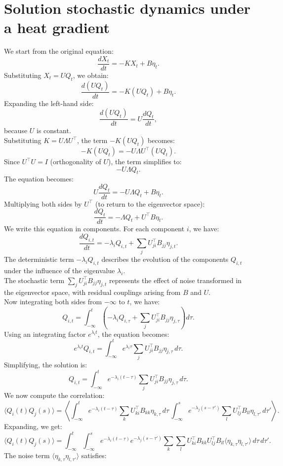 \documentclass[English, Lau, oneside]{sapthesis}
\begin{document}
\section{Solution stochastic dynamics under a heat gradient}
We start from the original equation:
\[
\frac{dX_t}{dt} = -K X_t + B \eta_t.
\]
Substituting \(X_t = U Q_t\), we obtain:
\[
\frac{d(U Q_t)}{dt} = -K (U Q_t) + B \eta_t.
\]
Expanding the left-hand side:
\[
\frac{d(U Q_t)}{dt} = U \frac{dQ_t}{dt},
\]
because \(U\) is constant.\\
Substituting \(K = U \Lambda U^\top\), the term \(-K(U Q_t)\) becomes:
\[
-K(U Q_t) = -U \Lambda U^\top (U Q_t).
\]
Since \(U^\top U = I\) (orthogonality of \(U\)), the term simplifies to:
\[
- U \Lambda Q_t.
\]
The equation becomes:
\[
U \frac{dQ_t}{dt} = -U \Lambda Q_t + B \eta_t.
\]
Multiplying both sides by \(U^\top\) (to return to the eigenvector space):
\[
\frac{dQ_t}{dt} = -\Lambda Q_t + U^\top B \eta_t.
\]
We write this equation in components. For each component \(i\), we have:
\[
\frac{dQ_{i,t}}{dt} = -\lambda_i Q_{i,t} + \sum_j U_{ji}^\top B_{jj} \eta_{j,t}.
\]
The deterministic term \(-\lambda_i Q_{i,t}\) describes the evolution of the components \(Q_{i,t}\) under the influence of the eigenvalue \(\lambda_i\).\\
The stochastic term \(\sum_j U_{ji}^\top B_{jj} \eta_{j,t}\) represents the effect of noise transformed in the eigenvector space, with residual couplings arising from \(B\) and \(U\).\\
Now integrating both sides from \(-\infty\) to \(t\), we have:
\[
Q_{i,t} = \int_{-\infty}^t \left( -\lambda_i Q_{i,\tau} + \sum_j U_{ji}^\top B_{jj} \eta_{j,\tau} \right) d\tau.
\]
Using an integrating factor \(e^{\lambda_i t}\), the equation becomes:
\[
e^{\lambda_i t} Q_{i,t} = \int_{-\infty}^t e^{\lambda_i \tau} \sum_j U_{ji}^\top B_{jj} \eta_{j,\tau} \, d\tau.
\]
Simplifying, the solution is:
\[
Q_{i,t} = \int_{-\infty}^t e^{-\lambda_i (t - \tau)} \sum_j U_{ji}^\top B_{jj} \eta_{j,\tau} \, d\tau.
\]
We now compute the correlation:
\[
\langle Q_i(t) Q_j(s) \rangle = \left\langle \int_{-\infty}^t e^{-\lambda_i (t - \tau)} \sum_k U_{ki}^\top B_{kk} \eta_{k,\tau} \, d\tau \, \int_{-\infty}^s e^{-\lambda_j (s - \tau')} \sum_l U_{lj}^\top B_{ll} \eta_{l,\tau'} \, d\tau' \right\rangle.
\]
Expanding, we get:
\[
\langle Q_i(t) Q_j(s) \rangle = \int_{-\infty}^t \int_{-\infty}^s e^{-\lambda_i (t - \tau)} e^{-\lambda_j (s - \tau')} \sum_k \sum_l U_{ki}^\top B_{kk} U_{lj}^\top B_{ll} \langle \eta_{k,\tau} \eta_{l,\tau'} \rangle \, d\tau \, d\tau'.
\]
The noise term \(\langle \eta_{k,\tau} \eta_{l,\tau'} \rangle\) satisfies:
\end{document}
